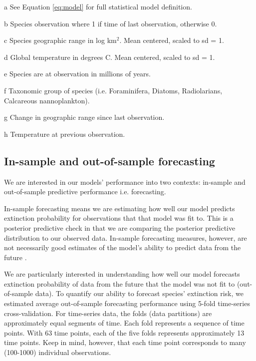 \documentclass[12pt,letterpaper]{article}
\begin{document}
\begin{refsection}
\begin{table}[ht]
\begin{threeparttable}
{\begin{tabular}{ l p{3cm} l l }
    \hline
   \end{tabular}
  }
  \begin{tablenotes}
  \item[a] See Equation \ref{eq:model} for full statistical model definition.
  \item[b] Species observation where 1 if time of last observation, otherwise 0.
  \item[c] Species geographic range in log km\(^2\). Mean centered, scaled to sd = 1.
  \item[d] Global temperature in degrees C. Mean centered, scaled to sd = 1.
  \item[e] Species are at observation in millions of years.
  \item[f] Taxonomic group of species (i.e. Foraminifera, Diatoms, Radiolarians, Calcareous nannoplankton).
  \item[g] Change in geographic range since last observation.
  \item[h] Temperature at previous observation.
  \end{tablenotes}
 \end{threeparttable}
 \label{tab:model_def}
\end{table}


\subsection{In-sample and out-of-sample forecasting}

We are interested in our models' performance into two contexts: in-sample and out-of-sample predictive performance i.e. forecasting. 

In-sample forecasting means we are estimating how well our model predicts extinction probability for observations that that model was fit to. This is a posterior predictive check in that we are comparing the posterior predictive distribution to our observed data. In-sample forecasting measures, however, are not necessarily good estimates of the model's ability to predict data from the future \citep{ESL}. 

We are particularly interested in understanding how well our model forecasts extinction probability of data from the future that the model was not fit to (out-of-sample data). To quantify our ability to forecast species' extinction risk, we estimated average out-of-sample forecasting performance using 5-fold time-series cross-validation. For time-series data, the folds (data partitions) are approximately equal segments of time. Each fold represents a sequence of time points. With 63 time points, each of the five folds represents approximately 13 time points. Keep in mind, however, that each time point corresponds to many (100-1000) individual observations.


\end{refsection}
\end{document}
